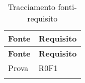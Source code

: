 \def\arraystretch{1.5}
\begin{longtable}{p{2.5cm}!{\VRule[1pt]}p{2.5cm}}
\color{white} \textbf{Fonte} & \color{white} \textbf{Requisito} \\ 
\endfirsthead 
{} 
\color{white} \textbf{Fonte} & \color{white} \textbf{Requisito} \\ 
\endhead 
Prova & R0F1 \\
\caption{Tracciamento fonti-requisito}
\end{longtable}